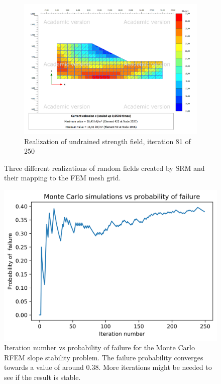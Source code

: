 \begin{figure}
\begin{subfigure}{0.475\textwidth}
    \includegraphics[width=\textwidth]{fig/ss/testp20211118-130042}
    \caption[]%
    {{\small Realization of undrained strength field, iteration 81 of 250}}
    \label{fig:mean and std of net66}
\end{subfigure}
\caption[ Three different realizations of random fields created by SRM.]
{\small Three different realizations of random fields created by SRM and their mapping to the FEM mesh grid.}
\label{fig:fourslopesfields}
\end{figure}


\begin{figure}[h]
	\includegraphics[width=\textwidth]{fig/pfailit20211116-090042}
	\caption{Iteration number vs probability of failure for the Monte Carlo RFEM slope stability problem. The failure probability converges towards a value of around 0.38. More iterations might be needed to see if the result is stable.}
	\label{fig:mc4}
\end{figure}

